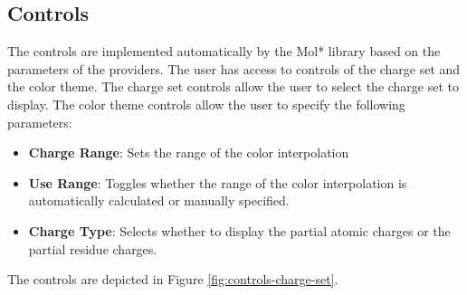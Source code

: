 \documentclass[
  digital,     %
  oneside,     %
  nosansbold,  %
  nocolorbold, %
  lof,         %
  lot,         %
]{fithesis4}
\begin{document}
\subsection{Controls}
\label{subsection:controls}

The controls are implemented automatically by the Mol* library based on the parameters of the providers. The user has access to controls of the charge set and the color theme. The charge set controls allow the user to select the charge set to display. The color theme controls allow the user to specify the following parameters:

\begin{itemize}
  \item \textbf{Charge Range}: Sets the range of the color interpolation
  \item \textbf{Use Range}: Toggles whether the range of the color interpolation is automatically calculated or manually specified.
  \item \textbf{Charge Type}: Selects whether to display the partial atomic charges or the partial residue charges.
\end{itemize}

The controls are depicted in Figure \ref{fig:controls-charge-set}.
\end{document}
